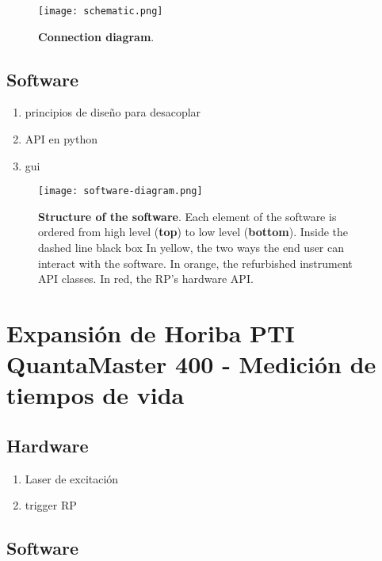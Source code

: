 \begin{figure}[h]
     \centering
     \texttt{[image: schematic.png]}
     \caption{\textbf{Connection diagram}.
     }
     \label{fig:schematic}
\end{figure}

\subsection{Software}



\begin{enumerate}
    \item principios de diseño para desacoplar
    \item API en python
    \item gui
\end{enumerate}

\begin{figure}[h]
     \centering
     \caption{\textbf{Structure of the software}. Each element of the software is ordered from high level (\textbf{top}) to low level (\textbf{bottom}). Inside the dashed line black box In yellow, the two ways the end user can interact with the software. In orange, the refurbished instrument API classes. In red, the RP's hardware API.}
     \texttt{[image: software-diagram.png]}
     \label{fig:code}
\end{figure}


\section{Expansión de Horiba PTI QuantaMaster 400 - Medición de tiempos de vida}
\subsection{Hardware}

\begin{enumerate}
    \item Laser de excitación
    \item trigger RP
\end{enumerate}

\subsection{Software}
